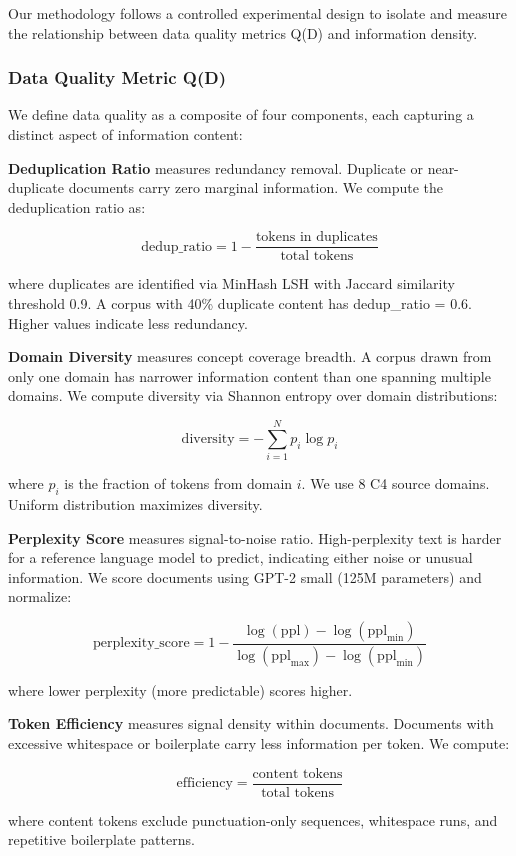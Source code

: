 
Our methodology follows a controlled experimental design to isolate and measure the relationship between data quality metrics Q(D) and information density.

\subsubsection{Data Quality Metric Q(D)}

We define data quality as a composite of four components, each capturing a distinct aspect of information content:

\textbf{Deduplication Ratio} measures redundancy removal. Duplicate or near-duplicate documents carry zero marginal information. We compute the deduplication ratio as:

$$
\text{dedup\_ratio} = 1 - \frac{\text{tokens in duplicates}}{\text{total tokens}}
$$

where duplicates are identified via MinHash LSH with Jaccard similarity threshold 0.9. A corpus with 40\% duplicate content has dedup\_ratio = 0.6. Higher values indicate less redundancy.

\textbf{Domain Diversity} measures concept coverage breadth. A corpus drawn from only one domain has narrower information content than one spanning multiple domains. We compute diversity via Shannon entropy over domain distributions:

$$
\text{diversity} = -\sum_{i=1}^{N} p_i \log p_i
$$

where $p_i$ is the fraction of tokens from domain $i$. We use 8 C4 source domains. Uniform distribution maximizes diversity.

\textbf{Perplexity Score} measures signal-to-noise ratio. High-perplexity text is harder for a reference language model to predict, indicating either noise or unusual information. We score documents using GPT-2 small (125M parameters) and normalize:

$$
\text{perplexity\_score} = 1 - \frac{\log(\text{ppl}) - \log(\text{ppl}_{\min})}{\log(\text{ppl}_{\max}) - \log(\text{ppl}_{\min})}
$$

where lower perplexity (more predictable) scores higher.

\textbf{Token Efficiency} measures signal density within documents. Documents with excessive whitespace or boilerplate carry less information per token. We compute:

$$
\text{efficiency} = \frac{\text{content tokens}}{\text{total tokens}}
$$

where content tokens exclude punctuation-only sequences, whitespace runs, and repetitive boilerplate patterns.

